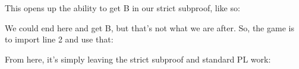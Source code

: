This opens up the ability to get B in our strict subproof, like so:

\begin{fitchproof}
\open
{}
\end{fitchproof}
We could end here and get \ediamond B, but that's not what we are after. So, the game is to import line 2 and use that:

\begin{fitchproof}
\open
{}
\end{fitchproof}
From here, it's simply leaving the strict subproof and standard PL work: 


\begin{fitchproof}
\open
{}
\close
{}
\end{fitchproof}
